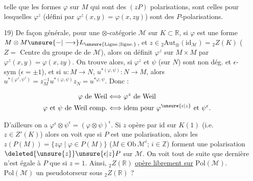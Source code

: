 \margin{\unsure{\ensuremath{\Vert}}}telle que les formes $\varphi$ sur $M$ qui sont des
$(zP)$ polarisations, sont celles pour lesquelles $\varphi^z$
(défini par $\varphi^z(x,y)=\varphi(x,zy)$) sont  des
$P$-polarisations.

19) De façon générale,  pour une $\otimes$-catégorie
$\mathcal M$ sur $K\subset\mathbb R$, si $\varphi$ est une forme
$M\otimes M\unsure{\mathord{-}|\longrightarrow}L_{\unsure{\mathrm{Ligne.}|\mathrm{ligne.}}}$,  et $z\in {}_2\mathrm{Aut}_{\otimes}(\mathrm{id}_{\mathcal M})={}_2Z(K)$
($Z=$ Centre du groupe de   de $\mathcal M$),
alors on définit $\varphi^z$ sur $M\times M$ par
$\varphi^z(x,y)=\varphi(x,zy)$. On trouve alors, si $\varphi^z$ et $\psi$ (sur $N$)
sont non dég. et $\epsilon$-sym ($\epsilon=\pm1$), et si
 $u:M\longrightarrow N$, $u^{*(\varphi,\psi)}:N\longrightarrow M$, alors
$u^{*(\varphi^z,\psi^z)}=z_M^{-1}u^{*(\varphi,\psi)}z_N=u^{*\varphi,\psi}$. Donc : 

\[
\begin{aligned}
\varphi\ \text{de Weil}&\Longleftrightarrow\varphi^z\ \text{de Weil}\\
\varphi\ \text{et}\ \psi\ \text{de Weil comp.}&\Longleftrightarrow\text{idem pour }\varphi^{\unsure{\epsilon|z}}\text{ et }\psi^\epsilon.
\end{aligned}
\]

D'ailleurs on a $\varphi^\epsilon\otimes\psi^\epsilon=(\varphi\otimes\psi)^\epsilon$. 
 Si $z$ opère par id sur $K(1)$
(i.e. $z\in Z'(K)$) alors on voit que si $P$ est
une polarisation, alors les $z(P(M))=\{z\varphi\mid\varphi\in P(M)\}$
($M\in\mathrm{Ob}\,\mathcal M^i$; $i\in\mathbb Z$) forment une polarisation $\deleted{\unsure{z}}\unsure{\epsilon|z}P$ sur $\mathcal M$.
On voit tout de suite que  dernière
n'est égale à $P$ que si $z=1$. Ainsi,
$ {}_2Z(\mathbb R)$ \uline{opère librement sur} $\mathrm{Pol}(\mathcal M)$. 
$\mathrm{Pol}(\mathcal M)$  un pseudotorseur sous $ {}_2Z(\mathbb R)$ ?
